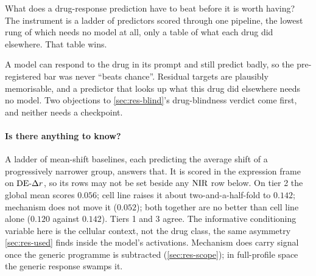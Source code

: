 
\label{sec:methods-baselines}

\begin{question}[7]
What does a drug-response prediction have to beat before it is worth having? The
instrument is a ladder of predictors scored through one pipeline, the lowest rung
of which needs no model at all, only a table of what each drug did elsewhere.
That table wins.
\end{question}

\noindent
A model can respond to the drug in its prompt and still predict badly, so the
pre-registered bar was never ``beats chance''. Residual targets are plausibly
memorisable, and a predictor that looks up what this drug did elsewhere needs no
model. Two objections to \cref{sec:res-blind}'s
drug-blindness verdict come first, and neither needs a checkpoint.

\paragraph{Is there anything to know?} A ladder of mean-shift baselines, each
predicting the average shift of a progressively narrower group, answers that.
It is scored in the expression frame on $\textrm{DE-}\Delta r$, so its rows may not be set
beside any $\textrm{NIR}$ row below. On tier 2 the global mean scores $0.056$; cell line
raises it about two-and-a-half-fold to $0.142$; mechanism does not move it
($0.052$); both together are no better than cell line alone ($0.120$ against
$0.142$). Tiers 1 and 3 agree. The informative conditioning variable here is the
cellular context, not the drug class, the same asymmetry \cref{sec:res-used}
finds inside the model's activations. Mechanism does carry signal once the
generic programme is subtracted (\cref{sec:res-scope}); in full-profile space the
generic response swamps it.

